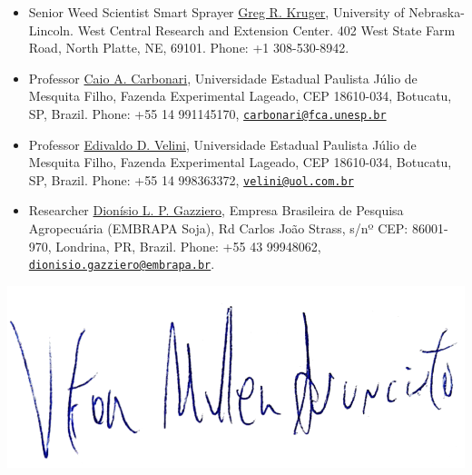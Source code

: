 \documentclass[11pt, a4paper]{awesome-cv}
\begin{document}
\begin{itemize}
\item
  Senior Weed Scientist Smart Sprayer \href{gkruger2@icloud.com}{Greg R.
  Kruger}, University of Nebraska-Lincoln. West Central Research and
  Extension Center. 402 West State Farm Road, North Platte, NE, 69101.
  Phone: +1 308-530-8942.
\item
  Professor \href{carbonari@fca.unesp.br}{Caio A. Carbonari},
  Universidade Estadual Paulista Júlio de Mesquita Filho, Fazenda
  Experimental Lageado, CEP 18610-034, Botucatu, SP, Brazil. Phone: +55
  14 991145170,
  \href{mailto:carbonari@fca.unesp.br}{\nolinkurl{carbonari@fca.unesp.br}}
\item
  Professor \href{velini@uol.com.br}{Edivaldo D. Velini}, Universidade
  Estadual Paulista Júlio de Mesquita Filho, Fazenda Experimental
  Lageado, CEP 18610-034, Botucatu, SP, Brazil. Phone: +55 14 998363372,
  \href{mailto:velini@uol.com.br}{\nolinkurl{velini@uol.com.br}}
\item
  Researcher \href{dionisio.gazziero@embrapa.br}{Dionísio L. P.
  Gazziero}, Empresa Brasileira de Pesquisa Agropecuária (EMBRAPA Soja),
  Rd Carlos João Strass, s/nº CEP: 86001-970, Londrina, PR, Brazil.
  Phone: +55 43 99948062,
  \href{mailto:dionisio.gazziero@embrapa.br}{\nolinkurl{dionisio.gazziero@embrapa.br}}.
\end{itemize}

\includegraphics{../data/signature.png}\\
\end{document}
